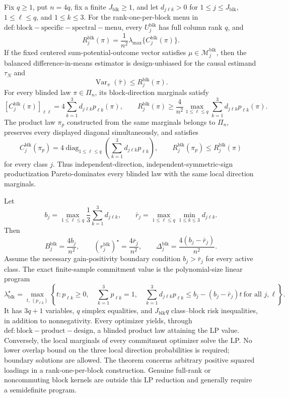 Fix \(q\ge1\), put \(n=4q\), fix a finite \(J_{\mathrm{blk}}\ge1\), and let \(d_{j\ell k}>0\) for \(1\le j\le J_{\mathrm{blk}}\), \(1\le\ell\le q\), and \(1\le k\le3\). For the rank-one-per-block menu in \(\mathrm{def:block-specific-spectral-menu}\), every \(U_j^{\mathrm{blk}}\) has full column rank \(q\), and
\[
R_j^{\mathrm{blk}}(\pi)
=\frac1{n^2}\lambda_{\max}\{C_j^{\mathrm{blk}}(\pi)\}.
\]
If the fixed centered sum-potential-outcome vector satisfies \(\mu\in\mathcal M_j^{\mathrm{blk}}\), then the balanced difference-in-means estimator is design-unbiased for the causal estimand \(\tau_N\) and
\[
\operatorname{Var}_\pi(\widehat\tau)\le R_j^{\mathrm{blk}}(\pi).
\]
For every blinded law \(\pi\in\Pi_n\), its block-direction marginals satisfy
\[
[C_j^{\mathrm{blk}}(\pi)]_{\ell\ell}
=4\sum_{k=1}^3d_{j\ell k}p_{\ell k}(\pi),
\qquad
R_j^{\mathrm{blk}}(\pi)
\ge\frac4{n^2}\max_{1\le\ell\le q}
\sum_{k=1}^3d_{j\ell k}p_{\ell k}(\pi).
\]
The product law \(\pi_p\) constructed from the same marginals belongs to \(\Pi_n\), preserves every displayed diagonal simultaneously, and satisfies
\[
C_j^{\mathrm{blk}}(\pi_p)
=4\operatorname{diag}_{1\le\ell\le q}
\left(\sum_{k=1}^3d_{j\ell k}p_{\ell k}\right),
\qquad
R_j^{\mathrm{blk}}(\pi_p)\le R_j^{\mathrm{blk}}(\pi)
\]
for every class \(j\). Thus independent-direction, independent-symmetric-sign productization Pareto-dominates every blinded law with the same local direction marginals.

Let
\[
b_j=\max_{1\le\ell\le q}\frac13\sum_{k=1}^3d_{j\ell k},
\qquad
\bar r_j=\max_{1\le\ell\le q}\min_{1\le k\le3}d_{j\ell k}.
\]
Then
\[
B_j^{\mathrm{blk}}=\frac{4b_j}{n^2},
\qquad
(r_j^{\mathrm{blk}})^\star=\frac{4\bar r_j}{n^2},
\qquad
\Delta_j^{\mathrm{blk}}=\frac{4(b_j-\bar r_j)}{n^2}.
\]
Assume the necessary gain-positivity boundary condition \(b_j>\bar r_j\) for every active class. The exact finite-sample commitment value is the polynomial-size linear program
\[
\boxed{
\lambda_{\mathrm{blk}}^\star
=\max_{t,\,(p_{\ell k})}
\left\{t:
p_{\ell k}\ge0,\quad
\sum_{k=1}^3p_{\ell k}=1,\quad
\sum_{k=1}^3d_{j\ell k}p_{\ell k}
\le b_j-(b_j-\bar r_j)t
\ \text{for all }j,\ell
\right\}.}
\]
It has \(3q+1\) variables, \(q\) simplex equalities, and \(J_{\mathrm{blk}}q\) class--block risk inequalities, in addition to nonnegativity. Every optimizer yields, through \(\mathrm{def:block-product-design}\), a blinded product law attaining the LP value. Conversely, the local marginals of every commitment optimizer solve the LP. No lower overlap bound on the three local direction probabilities is required; boundary solutions are allowed. The theorem concerns arbitrary positive squared loadings in a rank-one-per-block construction. Genuine full-rank or noncommuting block kernels are outside this LP reduction and generally require a semidefinite program.